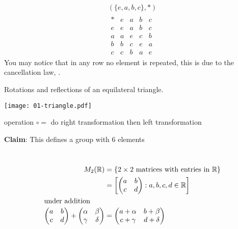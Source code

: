 \begin{example} \protect\hypertarget{exm:nine}{}\label{exm:nine}
~\vspace*{-1.5\baselineskip}
\begin{align*}
    \left( \{e, a, b, c\}, * \right) \\
    \begin{array}{c|cccc}
        * & e & a & b & c \\
        \hline
        e & e & a & b & c \\
        a & a & e & c & b \\
        b & b & c & e & a \\
        c & c & b & a & e
    \end{array} 
\end{align*}
%
You may notice that in any row no element is repeated, this is due to the cancellation law, .
\end{example}

\begin{example}
\protect\hypertarget{exm:triangle}{}\label{exm:triangle}
Rotations and reflections of an equilateral triangle.

{\centering
\texttt{[image: 01-triangle.pdf]}}

operation $\circ =$ do right transformation then left transformation

\textbf{Claim}: This defines a group with 6 elements
\end{example}

\begin{example} ~\vspace*{-1.5\baselineskip}
\begin{align*}
    M_2(\mathbb{R}) &= \{ 2 \times 2 \text{ matrices with entries in } \mathbb{R} \} \\
    &= \left[ \begin{pmatrix} a & b \\ c & d \end{pmatrix} : a, b, c, d \in \mathbb{R} \right] \\
    \intertext{under addition}
    \begin{pmatrix}
    a & b \\
    c & d
    \end{pmatrix} + 
    \begin{pmatrix}
    \alpha & \beta \\
    \gamma & \delta
    \end{pmatrix} &=
    \begin{pmatrix}
    a + \alpha & b + \beta \\
    c + \gamma & d + \delta
    \end{pmatrix}
\end{align*}
\end{example}

